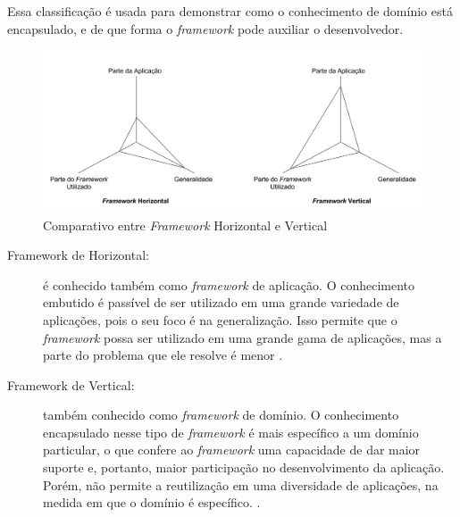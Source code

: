 Essa classificação é usada para demonstrar como o conhecimento de domínio está
encapsulado, e de que forma o \textit{framework} pode auxiliar o desenvolvedor.
\begin{figure}[h]
    \centering
    \includegraphics[width=\textwidth]{figuras/frameworkhorizontalvertical.png}
    \caption{Comparativo entre \textit{Framework} Horizontal e Vertical}
    \label{fig:frameworkhorizontalvertical}
  \end{figure}
\par
\begin{description}
\item[Framework de Horizontal:] é conhecido também como \textit{framework} de
aplicação. O conhecimento embutido é passível de ser utilizado em uma grande
variedade de aplicações, pois o seu foco é na generalização. Isso permite que o
\textit{framework} possa ser utilizado em uma grande gama de aplicações, mas a
parte do problema que ele resolve é menor \cite{barretoJunior2006}.
\item[Framework de Vertical:] também conhecido como \textit{framework} de domínio.
O conhecimento encapsulado nesse tipo de \textit{framework} é mais específico a
um domínio particular, o que confere ao \textit{framework} uma capacidade de dar
maior suporte e, portanto, maior participação no desenvolvimento da aplicação.
Porém, não permite a reutilização em uma diversidade de aplicações, na medida
em que o domínio é específico. \cite{barretoJunior2006}.
\end{description}

